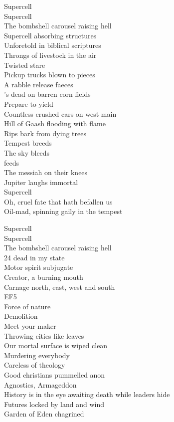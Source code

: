 Supercell \\
Supercell \\
The bombshell carousel raising hell \\

Supercell absorbing structures \\
Unforetold in biblical scriptures \\
Throngs of livestock in the air \\
Twisted stare \\
Pickup trucks blown to pieces \\
A rabble release faeces \\
's dead on barren corn fields \\
Prepare to yield \\
Countless crushed cars on west main \\
Hill of Gaash flooding with flame \\
Rips bark from dying trees \\
Tempest breeds \\
The sky bleeds \\
 feeds \\
The messiah on their knees \\
Jupiter laughs immortal \\
Supercell \\

Oh, cruel fate that hath befallen us \\
Oil-mad, spinning gaily in the tempest\

Supercell \\
Supercell \\
The bombshell carousel raising hell \\

24 dead in my state \\
Motor spirit subjugate \\
Creator, a burning mouth \\
Carnage north, east, west and south \\
EF5 \\
Force of nature \\
Demolition \\
Meet your maker \\
Throwing cities like leaves \\
Our mortal surface is wiped clean \\

Murdering everybody \\
Careless of theology \\
Good christians pummelled anon \\
Agnostics, Armageddon \\
History is in the eye awaiting death while leaders hide \\
Futures locked by land and wind \\
Garden of Eden chagrined \\

